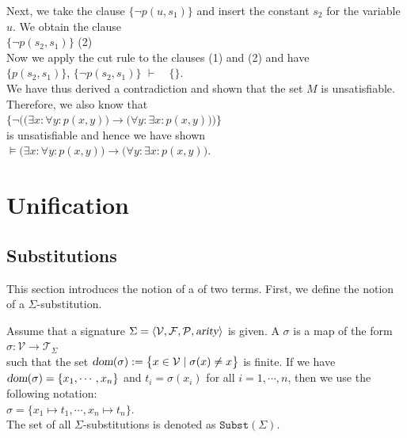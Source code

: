 Next, we take the clause $\big\{\neg p(u,s_1)\big\}$ and
insert the constant $s_2$ for the variable $u$.  We obtain the 
clause \\[0.2cm]
\hspace*{1.3cm} $\big\{\neg p(s_2,s_1)\big\}$ \hspace*{\fill} (2) \\[0.2cm]
Now we apply the cut rule to the clauses (1) and (2) and have \\[0.2cm]
\hspace*{1.3cm} 
$\big\{ p(s_2,s_1) \big\}$, \quad$\big\{\neg p(s_2,s_1)\big\}$ \quad $\vdash \quad \{\}$.
\\[0.2cm]
We have thus derived a contradiction and shown that the set $M$ is unsatisfiable.  Therefore, we also know that
\\[0.2cm]
\hspace*{1.3cm} 
$\Big\{ \neg \Big(\big(\exists x\colon \forall y\colon  p(x,y)\big) \rightarrow  \big(\forall y\colon \exists x\colon p(x,y)\big)\Big)\Big\}$
\\[0.2cm]
is unsatisfiable and hence we have shown \\[0.2cm]
\hspace*{1.3cm} 
$\models \big(\exists x\colon \forall y\colon  p(x,y)\big) \rightarrow  \big(\forall y\colon \exists x\colon p(x,y)\big)$.

\section{Unification}
\subsection{Substitutions}
This section introduces the notion of a  of two terms.
First, we define the notion of a $\Sigma$-substitution.

\begin{Definition}
  Assume that a signature $\Sigma = \langle \mathcal{V}, \mathcal{F}, \mathcal{P}, \textsl{arity} \rangle$ is given.
  A  $\sigma$ is a map of the form
  \\[0.2cm]
  \hspace*{1.3cm}
  $\sigma: \mathcal{V} \rightarrow \mathcal{T}_\Sigma$ 
  \\[0.2cm]
  such that the set $\textsl{dom}(\sigma) := \bigl\{ x \in \mathcal{V} \mid \sigma(x) \not= x \bigr\}$ is finite.
  If we have $\textsl{dom}(\sigma) = \{ x_1, \cdots, x_n \}$ and $t_i = \sigma(x_i)$ for all $i = 1, \cdots, n$,
  then we use the following notation:
  \\[0.2cm]
  \hspace*{1.3cm}
  $\sigma = \{ x_1 \mapsto t_1, \cdots, x_n \mapsto t_n \}$.
  \\[0.2cm]
  The set of all $\Sigma$-substitutions is denoted as $\mathtt{Subst}(\Sigma)$.
  \eox
\end{Definition}

